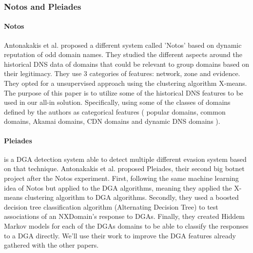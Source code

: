 \subsubsection{Notos and Pleiades}
\paragraph{Notos}
Antonakakis et al. \cite{dnsreputation} proposed a different system called 'Notos' based on dynamic reputation of odd domain names. They studied the different aspects around the historical DNS data of domains that could be relevant to group domains based on their legitimacy. They use 3 categories of features: network, zone and evidence. They opted for a unsupervised approach using the clustering algorithm X-means. The purpose of this paper is to utilize some of the historical DNS features to be used in our all-in solution. Specifically, using some of the classes of domains defined by the authors as categorical features ( popular domains, common domains, Akamai domains,  CDN domains and dynamic DNS domains ).

\paragraph{Pleiades} is a DGA detection system able to detect multiple different evasion system based on that technique.
Antonakakis et al. \cite{pleiades} proposed Pleiades, their second big botnet project after the Notos experiment. First, following the same machine learning idea of Notos but applied to the DGA algorithms, meaning they applied the X-means clustering algorithm to DGA algorithms. Secondly, they used a boosted decision tree classification algorithm (Alternating Decision Tree) to test associations of an NXDomain's response to  DGAs. Finally, they created Hiddem Markov models for each of the DGAs domains to be able to classify the responses to a DGA directly. We'll use their work to improve the DGA features already gathered with the other papers.


